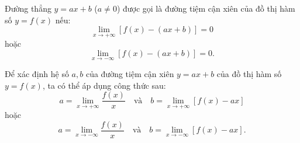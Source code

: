 \documentclass[12pt,a4paper]{extarticle}
\begin{document}
\begin{minipage}{0.55\textwidth}
    \begin{doublelinebox}
        Đường thẳng $y = ax + b$ ($a \neq 0$) được gọi là đường tiệm cận xiên của đồ thị hàm số $y = f(x)$ nếu:
        \[
        \lim_{x \to +\infty} [f(x) - (ax + b)] = 0
        \]
        hoặc
        \[
        \lim_{x \to -\infty} [f(x) - (ax + b)] = 0.
        \]
    \end{doublelinebox}
\end{minipage}
\hfill
\begin{minipage}{0.4\textwidth}
    \centering
\end{minipage}

\vspace{0.5cm}
\noindent Để xác định hệ số $a, b$ của đường tiệm cận xiên $y = ax + b$ của đồ thị hàm số $y = f(x)$, ta có thể áp dụng công thức sau:
\[
a = \lim_{x \to +\infty} \frac{f(x)}{x} \quad \text{và} \quad b = \lim_{x \to +\infty} [f(x) - ax]
\]
hoặc
\[
a = \lim_{x \to -\infty} \frac{f(x)}{x} \quad \text{và} \quad b = \lim_{x \to -\infty} [f(x) - ax].
\]
\end{document}
